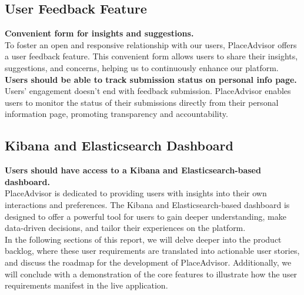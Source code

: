 \documentclass[../main.tex]{subfiles}
\begin{document}
\subsection{User Feedback Feature}
\textbf{Convenient form for insights and suggestions.}\\
To foster an open and responsive relationship with our users, PlaceAdvisor offers a user feedback feature. This convenient form allows users to share their insights, suggestions, and concerns, helping us to continuously enhance our platform.\\
\textbf{Users should be able to track submission status on personal info page.}\\
Users' engagement doesn't end with feedback submission. PlaceAdvisor enables users to monitor the status of their submissions directly from their personal information page, promoting transparency and accountability.

\subsection{Kibana and Elasticsearch Dashboard}

\textbf{Users should have access to a Kibana and Elasticsearch-based dashboard.}\\
PlaceAdvisor is dedicated to providing users with insights into their own interactions and preferences. The Kibana and Elasticsearch-based dashboard is designed to offer a powerful tool for users to gain deeper understanding, make data-driven decisions, and tailor their experiences on the platform.\\


In the following sections of this report, we will delve deeper into the product backlog, where these user requirements are translated into actionable user stories, and discuss the roadmap for the development of PlaceAdvisor. Additionally, we will conclude with a demonstration of the core features to illustrate how the user requirements manifest in the live application.
\end{document}
